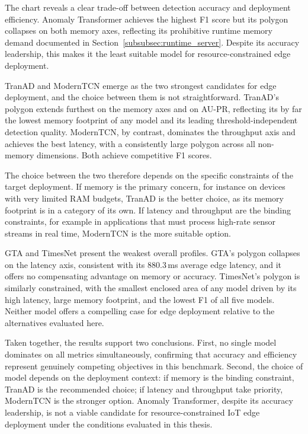 \documentclass[twoside,11pt,openright]{report}
\begin{document}
The chart reveals a clear trade-off between detection accuracy and deployment
efficiency. Anomaly Transformer \citep{anomalytransformer2022} achieves the highest
F1 score but its polygon collapses on both memory axes, reflecting its prohibitive
runtime memory demand documented in Section~\ref{subsubsec:runtime_server}. Despite
its accuracy leadership, this makes it the least suitable model for
resource-constrained edge deployment.

TranAD \citep{tranad2022} and ModernTCN \citep{moderntcn2024} emerge as the two
strongest candidates for edge deployment, and the choice between them is not
straightforward. TranAD's polygon extends furthest on the memory axes and on AU-PR,
reflecting its by far the lowest memory footprint of any model and its leading
threshold-independent detection quality. ModernTCN, by contrast, dominates the
throughput axis and achieves the best latency, with a consistently large polygon
across all non-memory dimensions. Both achieve competitive F1 scores.

The choice between the two therefore depends on the specific constraints of the
target deployment. If memory is the primary concern, for instance on devices
with very limited RAM budgets, TranAD is the better choice, as its memory
footprint is in a category of its own. If latency and throughput are the binding
constraints, for example in applications that must process high-rate sensor
streams in real time, ModernTCN is the more suitable option.

GTA \citep{gta2022} and TimesNet \citep{timesnet2023} present the weakest overall
profiles. GTA's polygon collapses on the latency axis, consistent with its
880.3\,ms average edge latency, and it offers no compensating advantage on memory
or accuracy. TimesNet's polygon is similarly constrained, with the smallest
enclosed area of any model driven by its high latency, large memory footprint,
and the lowest F1 of all five models. Neither model offers a compelling case for
edge deployment relative to the alternatives evaluated here.

Taken together, the results support two conclusions. First, no single model
dominates on all metrics simultaneously, confirming that accuracy and efficiency
represent genuinely competing objectives in this benchmark. Second, the choice of
model depends on the deployment context: if memory is the binding constraint,
TranAD is the recommended choice; if latency and throughput take priority,
ModernTCN is the stronger option. Anomaly Transformer, despite its accuracy
leadership, is not a viable candidate for resource-constrained IoT edge deployment
under the conditions evaluated in this thesis.
\end{document}
